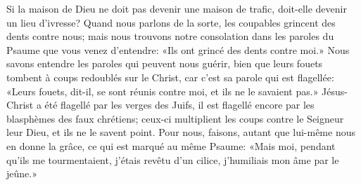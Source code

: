 Si la maison de Dieu ne doit pas devenir une maison de trafic,
	doit-elle devenir un lieu d’ivresse?
Quand nous parlons de la sorte, les coupables grincent des dents contre nous;
	mais nous trouvons notre consolation
		dans les paroles du Psaume que vous venez d’entendre:
	«Ils ont grincé des dents contre moi.»
Nous savons entendre les paroles qui peuvent nous guérir,
	bien que leurs fouets tombent à coups redoublés sur le Christ,
	car c’est sa parole qui est flagellée:
	«Leurs fouets, dit-il, se sont réunis contre moi,
		et ils ne le savaient pas.»
Jésus-Christ a été flagellé par les verges des Juifs,
	il est flagellé encore par les blasphèmes des faux chrétiens;
	ceux-ci multiplient les coups contre le Seigneur leur Dieu,
	et ils ne le savent point.
Pour nous, faisons, autant que lui-même nous en donne la grâce,
	ce qui est marqué au même Psaume:
	«Mais moi, pendant qu’ils me tourmentaient,
	j’étais revêtu d’un cilice, j’humiliais mon âme par le jeûne.»

